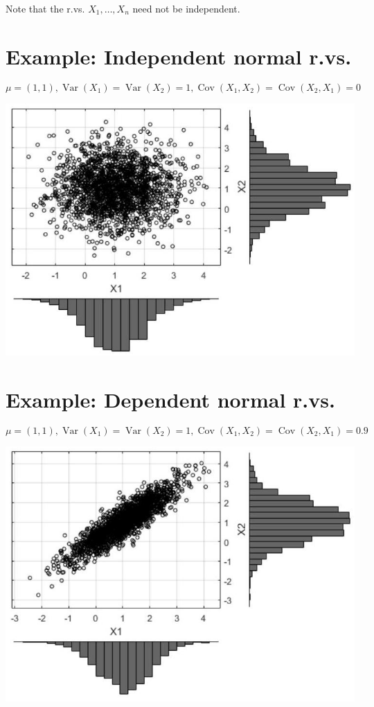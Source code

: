 \documentclass[10pt]{article}
\begin{document}
Note that the r.vs. $X_{1}, \ldots, X_{n}$ need not be independent.

\section*{Example: Independent normal r.vs.}
$$
\mu=(1,1), \operatorname{Var}\left(X_{1}\right)=\operatorname{Var}\left(X_{2}\right)=1, \operatorname{Cov}\left(X_{1}, X_{2}\right)=\operatorname{Cov}\left(X_{2}, X_{1}\right)=0
$$

\begin{center}
\includegraphics[max width=\textwidth]{2025_05_11_84d245f69223a25e0522g-26}
\end{center}

\section*{Example: Dependent normal r.vs.}
$$
\mu=(1,1), \operatorname{Var}\left(X_{1}\right)=\operatorname{Var}\left(X_{2}\right)=1, \operatorname{Cov}\left(X_{1}, X_{2}\right)=\operatorname{Cov}\left(X_{2}, X_{1}\right)=0.9
$$

\begin{center}
\includegraphics[max width=\textwidth]{2025_05_11_84d245f69223a25e0522g-27}
\end{center}
\end{document}
